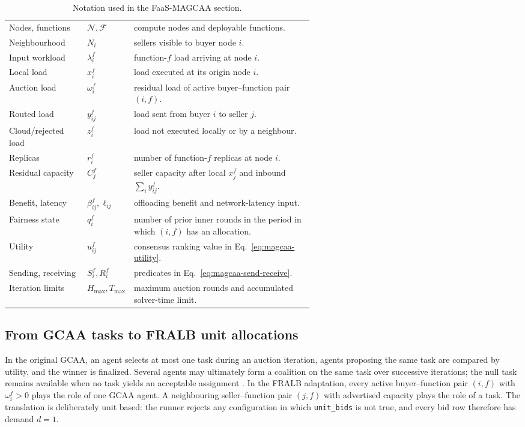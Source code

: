 \begin{table}[t]
\centering
\caption{Notation used in the FaaS-MAGCAA section.}
\label{tab:magcaa-notation}
\small
\begin{tabular}{@{}l l p{0.59\linewidth}@{}}
\toprule
Nodes, functions & $\mathcal N,\mathcal F$ & compute nodes and deployable functions.\\
Neighbourhood & $N_i$ & sellers visible to buyer node $i$.\\
Input workload & $\lambda_i^f$ & function-$f$ load arriving at node $i$.\\
Local load & $x_i^f$ & load executed at its origin node $i$.\\
Auction load & $\omega_i^f$ & residual load of active buyer--function pair $(i,f)$.\\
Routed load & $y_{ij}^f$ & load sent from buyer $i$ to seller $j$.\\
Cloud/rejected load & $z_i^f$ & load not executed locally or by a neighbour.\\
Replicas & $r_i^f$ & number of function-$f$ replicas at node $i$.\\
Residual capacity & $C_j^f$ & seller capacity after local $x_j^f$ and inbound $\sum_i y_{ij}^f$.\\
Benefit, latency & $\beta_{ij}^f,\ell_{ij}$ & offloading benefit and network-latency input.\\
Fairness state & $q_i^f$ & number of prior inner rounds in the period in which $(i,f)$ has an allocation.\\
Utility & $u_{ij}^f$ & consensus ranking value in Eq.~\eqref{eq:magcaa-utility}.\\
Sending, receiving & $S_i^f,R_i^f$ & predicates in Eq.~\eqref{eq:magcaa-send-receive}.\\
Iteration limits & $H_{\max},T_{\max}$ & maximum auction rounds and accumulated solver-time limit.\\
\bottomrule
\end{tabular}
\end{table}

\subsection{From GCAA tasks to FRALB unit allocations}
\label{sec:magcaa-mapping}

In the original GCAA, an agent selects at most one task during an auction
iteration, agents proposing the same task are compared by utility, and the
winner is finalized. Several agents may ultimately form a coalition on the
same task over successive iterations; the null task remains available when
no task yields an acceptable assignment \citep{braquetbakolas2021}. In the
FRALB adaptation, every active buyer--function pair $(i,f)$ with
$\omega_i^f>0$ plays the role of one GCAA agent. A neighbouring
seller--function pair $(j,f)$ with advertised capacity plays the role of a
task. The translation is deliberately unit based: the runner rejects any
configuration in which \texttt{unit\_bids} is not true, and every bid row
therefore has demand $d=1$.

